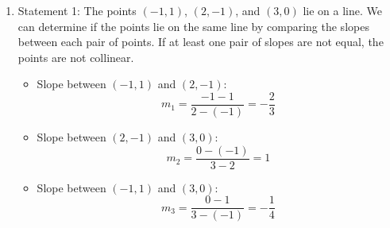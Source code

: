 \documentclass{article}
\begin{document}
\begin{enumerate}
    \item Statement 1: The points $(-1,1)$, $(2,-1)$, and $(3,0)$ lie on a line.\newline
          We can determine if the points lie on the same line by comparing the slopes between each pair of points.
          If at least one pair of slopes are not equal, the points are not collinear.

          \begin{itemize}
              \item Slope between \((-1, 1)\) and \((2, -1)\):
                    \[
                        m_1 = \frac{-1 - 1}{2 - (-1)} = -\frac{2}{3}
                    \]

              \item Slope between \((2, -1)\) and \((3, 0)\):
                    \[
                        m_2 = \frac{0 - (-1)}{3 - 2} = 1
                    \]

              \item Slope between \((-1, 1)\) and \((3, 0)\):
                    \[
                        m_3 = \frac{0 - 1}{3 - (-1)} = -\frac{1}{4}
                    \]
          \end{itemize}


\end{enumerate}
\end{document}
